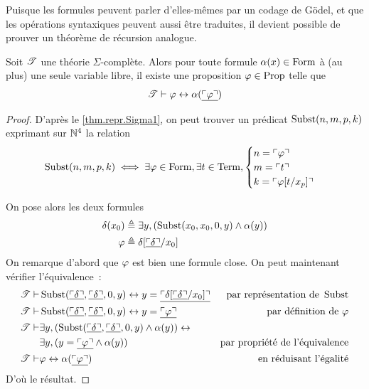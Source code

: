 Puisque les formules peuvent parler d'elles-mêmes par un codage de Gödel, et
que les opérations syntaxiques peuvent aussi être traduites, il devient
possible de prouver un théorème de récursion analogue.

\begin{lemma}\label{lem.fix.godel}
  Soit $\mathscr T$ une théorie $\Sigma$-complète. Alors pour toute formule
  $\alpha(x)\in\operatorname{Form}$ à (au plus) une seule variable libre, il existe une
  proposition $\varphi \in \operatorname{Prop}$ telle que
  \[\mathscr T \vdash \varphi \mathrel{\leftrightarrow} \alpha(\underline{\ulcorner\varphi\urcorner})\]
\end{lemma}

\begin{proof}
  D'après le \cref{thm.repr.Sigma1}, on peut trouver un prédicat
  $\operatorname{Subst}(n,m,p,k)$ exprimant sur $\mathbb N^4$ la relation
  \[\operatorname{Subst}(n,m,p,k) \iff \exists \varphi \in \operatorname{Form}, \exists t \in \operatorname{Term},
  \begin{cases}
    n = \ulcorner\varphi\urcorner \\
    m = \ulcorner t\urcorner \\
    k = \ulcorner\varphi[t/x_p]\urcorner
  \end{cases}\]

  On pose alors les deux formules
  \begin{align*}
    \delta(x_0) &\triangleq \exists y,
    (\operatorname{Subst}(x_0,x_0,0,y) \land \alpha(y)) \\
    \varphi &\triangleq \delta[\underline{\ulcorner\delta\urcorner}/x_0]
  \end{align*}
  On remarque d'abord que $\varphi$ est bien une formule close. On peut
  maintenant vérifier l'équivalence~:
  \begin{align*}
    \mathscr T \vdash& \operatorname{Subst}(\underline{\ulcorner\delta\urcorner},\underline{\ulcorner\delta\urcorner},
    0,y) \mathrel{\leftrightarrow} y = \underline{\ulcorner\delta[\underline{\ulcorner\delta\urcorner}/x_0]\urcorner} &
    \text{par représentation de }\operatorname{Subst} \\
    \mathscr T \vdash& \operatorname{Subst}(\underline{\ulcorner\delta\urcorner},\underline{\ulcorner\delta\urcorner},
    0,y) \mathrel{\leftrightarrow} y = \underline{\ulcorner\varphi\urcorner} &
    \text{par définition de }\varphi \\
    \mathscr T \vdash& \exists y,
    (\operatorname{Subst}(\underline{\ulcorner\delta\urcorner},\underline{\ulcorner\delta\urcorner}, 0,y) \land
    \alpha(y))
    \mathrel{\leftrightarrow} \\
    &\exists y, (y = \underline{\ulcorner\varphi\urcorner} \land \alpha(y))
    & \text{par propriété de l'équivalence}\\
    \mathscr T \vdash& \varphi \mathrel{\leftrightarrow} \alpha(\underline{\ulcorner\varphi\urcorner}) &
    \text{en réduisant l'égalité}
  \end{align*}
  D'où le résultat.
\end{proof}

